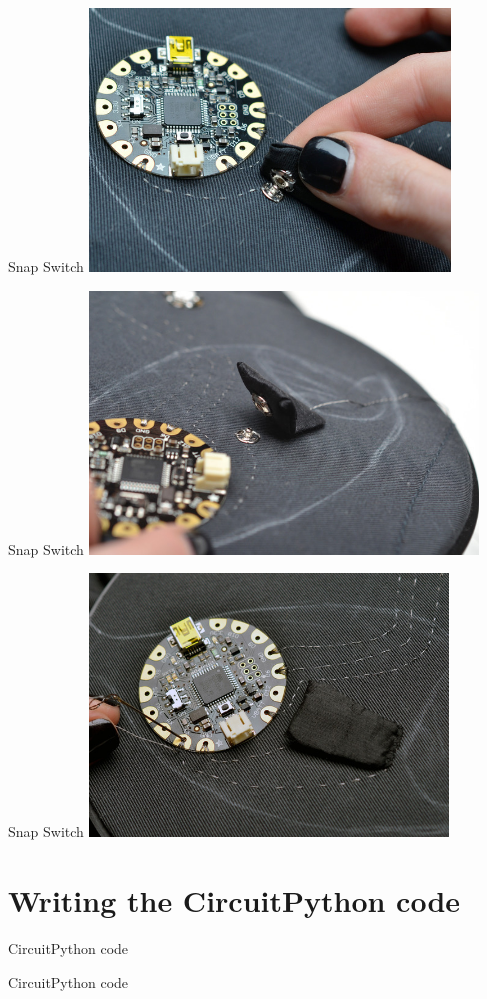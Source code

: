 \documentclass[aspectratio=169]{beamer}
\begin{document}
\begin{frame}[fragile]{Snap Switch}
\includegraphics[height=2.75in]{flora-angler-embroidery-22.jpg}
\end{frame}
\begin{frame}[fragile]{Snap Switch}
\includegraphics[height=2.75in]{flora-angler-embroidery-23.jpg}
\end{frame}
\begin{frame}[fragile]{Snap Switch}
\includegraphics[height=2.75in]{flora-angler-embroidery-24.jpg}
\end{frame}
\part{Writing the CircuitPython code}
\begin{frame}[fragile]{CircuitPython code}

\end{frame}
\begin{frame}[fragile]{CircuitPython code}

\end{frame}
\end{document}
